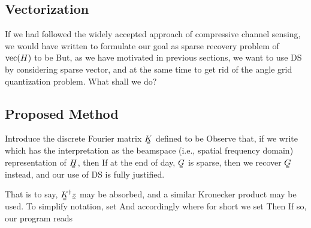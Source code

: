 \subsection{Vectorization}

If we had followed the widely accepted approach of compressive channel sensing, we would have written
%
%
to formulate our goal as sparse recovery problem of \(\mathrm{vec} (H)\) to be
%
%
But, as we have motivated in previous sections, we want to use DS by considering sparse vector, and at the same time to get rid of the angle grid quantization problem.
What shall we do?

\subsection{Proposed Method}

Introduce the discrete Fourier matrix \(\M{K}\) defined to be
%
%
Observe that, if we write
%
%
which has the interpretation as the beamspace (i.e., spatial frequency domain) representation of \(\M{H}\), then
%
%
If at the end of day, \(\M{G}\) is sparse, then we recover \(\M{G}\) instead, and our use of DS is fully justified.

That is to say, \(\M{K}^\H \V{z}\) may be absorbed, and a similar Kronecker product may be used.
To simplify notation, set
%
%
And accordingly
where for short we set
%
Then
%
%
If so, our program reads

